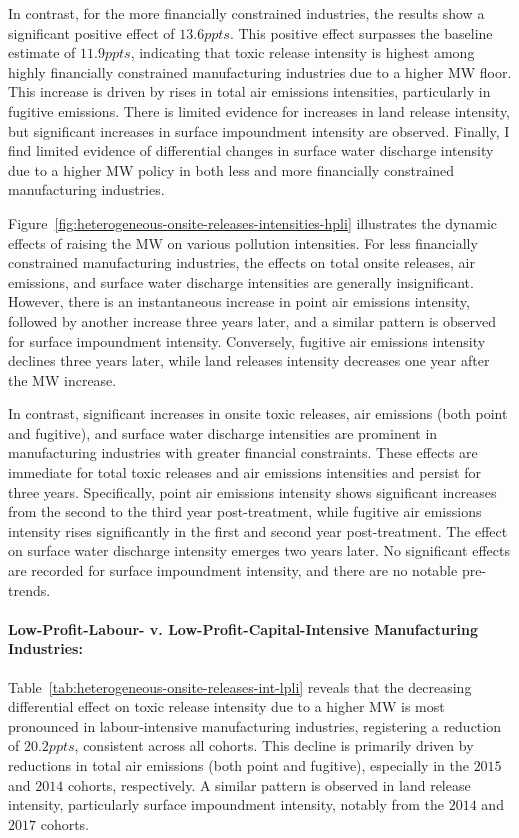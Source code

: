 \documentclass[12pt, english]{article}
\begin{document}
    In contrast, for the more financially constrained industries, the results show a significant positive effect of $13.6ppts$. This positive effect surpasses the baseline estimate of $11.9ppts$, indicating that toxic release intensity is highest among highly financially constrained manufacturing industries due to a higher MW floor. This increase is driven by rises in total air emissions intensities, particularly in fugitive emissions. There is limited evidence for increases in land release intensity, but significant increases in surface impoundment intensity are observed. Finally, I find limited evidence of differential changes in surface water discharge intensity due to a higher MW policy in both less and more financially constrained manufacturing industries.

    Figure~\ref{fig:heterogeneous-onsite-releases-intensities-hpli} illustrates the dynamic effects of raising the MW on various pollution intensities. For less financially constrained manufacturing industries, the effects on total onsite releases, air emissions, and surface water discharge intensities are generally insignificant. However, there is an instantaneous increase in point air emissions intensity, followed by another increase three years later, and a similar pattern is observed for surface impoundment intensity. Conversely, fugitive air emissions intensity declines three years later, while land releases intensity decreases one year after the MW increase.
    

    In contrast, significant increases in onsite toxic releases, air emissions (both point and fugitive), and surface water discharge intensities are prominent in manufacturing industries with greater financial constraints. These effects are immediate for total toxic releases and air emissions intensities and persist for three years. Specifically, point air emissions intensity shows significant increases from the second to the third year post-treatment, while fugitive air emissions intensity rises significantly in the first and second year post-treatment. The effect on surface water discharge intensity emerges two years later. No significant effects are recorded for surface impoundment intensity, and there are no notable pre-trends.

    \paragraph{Low-Profit-Labour- v. Low-Profit-Capital-Intensive Manufacturing Industries:}
    Table~\ref{tab:heterogeneous-onsite-releases-int-lpli} reveals that the decreasing differential effect on toxic release intensity due to a higher MW is most pronounced in labour-intensive manufacturing industries, registering a reduction of $20.2ppts$, consistent across all cohorts. This decline is primarily driven by reductions in total air emissions (both point and fugitive), especially in the $2015$ and $2014$ cohorts, respectively. A similar pattern is observed in land release intensity, particularly surface impoundment intensity, notably from the $2014$ and $2017$ cohorts.
    
\end{document}
